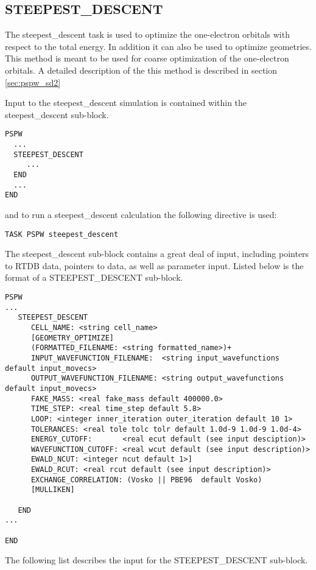 \subsection{STEEPEST\_DESCENT} 

The steepest\_descent task is used to optimize the one-electron orbitals
with respect to the total energy.  In addition it can also be used to optimize
geometries.   This method is meant to be used for coarse optimization of
the one-electron orbitals.  A detailed description of the this method
is described in section \ref{sec:pspw_sd2}

Input to the steepest\_descent simulation is contained
within the steepest\_descent sub-block.
\begin{verbatim}
PSPW
  ...
  STEEPEST_DESCENT
     ...
  END
  ...
END
\end{verbatim}
and to run a steepest\_descent calculation the following directive is used:
\begin{verbatim}
TASK PSPW steepest_descent 
\end{verbatim}
The steepest\_descent sub-block contains a great deal
of input, including pointers to RTDB data, pointers to data, as well as
parameter input.  Listed below is the format of a STEEPEST\_DESCENT sub-block.
\begin{verbatim}
PSPW
...
   STEEPEST_DESCENT
      CELL_NAME: <string cell_name>
      [GEOMETRY_OPTIMIZE]
      (FORMATTED_FILENAME: <string formatted_name>)+
      INPUT_WAVEFUNCTION_FILENAME:  <string input_wavefunctions  default input_movecs>
      OUTPUT_WAVEFUNCTION_FILENAME: <string output_wavefunctions default input_movecs>
      FAKE_MASS: <real fake_mass default 400000.0>
      TIME_STEP: <real time_step default 5.8>
      LOOP: <integer inner_iteration outer_iteration default 10 1>
      TOLERANCES: <real tole tolc tolr default 1.0d-9 1.0d-9 1.0d-4>
      ENERGY_CUTOFF:       <real ecut default (see input desciption)>
      WAVEFUNCTION_CUTOFF: <real wcut default (see input description)>
      EWALD_NCUT: <integer ncut default 1>]
      EWALD_RCUT: <real rcut default (see input description)>
      EXCHANGE_CORRELATION: (Vosko || PBE96  default Vosko)
      [MULLIKEN]

   END
...

END
\end{verbatim}
The following list describes the input for the STEEPEST\_DESCENT
sub-block.
